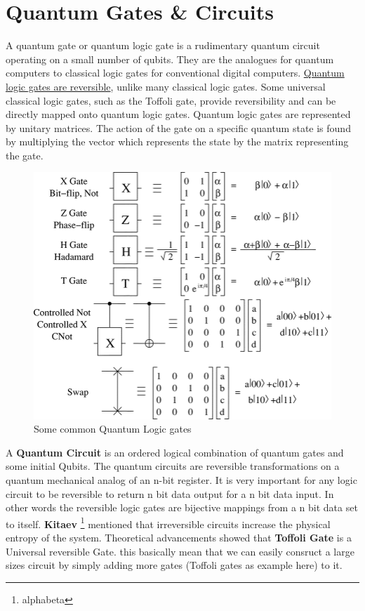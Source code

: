 \section{Quantum Gates \& Circuits}
A quantum gate or quantum logic gate is a rudimentary quantum circuit operating on a small number of qubits. They are the analogues for quantum computers to classical logic gates for conventional digital computers. \underline{Quantum logic gates are reversible}, unlike many classical logic gates. Some universal classical logic gates, such as the Toffoli gate, provide reversibility and can be directly mapped onto quantum logic gates. Quantum logic gates are represented by unitary matrices. The action of the gate on a specific quantum state is found by multiplying the vector which represents the state by the matrix representing the gate.\\


\begin{figure}[!htb]
\centering
  \includegraphics[scale=0.4]{qgates}
  \caption{Some common Quantum Logic gates}
\end{figure}

A \textbf{Quantum Circuit} is an ordered logical combination of quantum gates and some initial Qubits. The quantum circuits are reversible transformations on a quantum mechanical analog of an n-bit register. It is very important for any logic circuit to be reversible to return n bit data output for a n bit data input. In other words the reversible logic gates are bijective mappings from a n bit data set to itself. \textbf{Kitaev} \footnote{alphabeta} mentioned that irreversible circuits increase the physical entropy of the system. Theoretical advancements showed that \textbf{Toffoli Gate} is a Universal reversible Gate. this basically mean that we can easily consruct a large sizes circuit by simply adding more gates (Toffoli gates as example here) to it.

